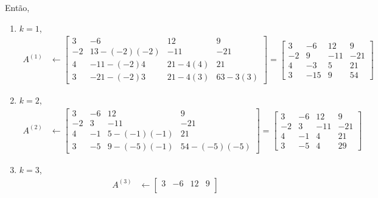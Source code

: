 \begin{questions}
\begin{solution}
        Ent\~{a}o,
        \begin{enumerate}
            \item $k = 1$,
                \begin{align*}
                    A^{(1)} &\leftarrow \begin{bmatrix}
                        3 & -6 & 12 & 9 \\
                        -2 & 13 - (-2)(-2) & -11 & -21 \\
                        4 & -11 - (-2)4 & 21 - 4(4) & 21 \\
                        3 & -21 -(-2)3 & 21 - 4(3) & 63 - 3(3)
                    \end{bmatrix} = \begin{bmatrix}
                        3 & -6 & 12 & 9 \\
                        -2 & 9 & -11 & -21 \\
                        4 & -3 & 5 & 21 \\
                        3 & -15 & 9 & 54
                    \end{bmatrix}
                \end{align*}
            \item $k = 2$,
                \begin{align*}
                    A^{(2)} &\leftarrow \begin{bmatrix}
                        3 & -6 & 12 & 9 \\
                        -2 & 3 & -11 & -21 \\
                        4 & -1 & 5 - (-1)(-1) & 21 \\
                        3 & -5 & 9 - (-5)(-1) & 54 - (-5)(-5)
                    \end{bmatrix} = \begin{bmatrix}
                        3 & -6 & 12 & 9 \\
                        -2 & 3 & -11 & -21 \\
                        4 & -1 & 4 & 21 \\
                        3 & -5 & 4 & 29
                    \end{bmatrix}
                \end{align*}
           \item  $k = 3$,
               \begin{align*}
                   A^{(3)} &\leftarrow \begin{bmatrix}
                        3 & -6 & 12 & 9 \\

\end{bmatrix}
\end{align*}
\end{enumerate}
\end{solution}
\end{questions}
